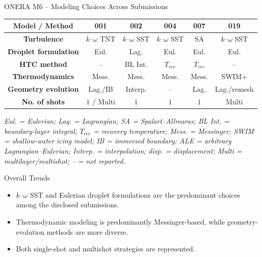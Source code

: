 \begin{frame}{\small ONERA M6 -- Modeling Choices Across Submissions}
\scriptsize

\centering

\renewcommand{\arraystretch}{1.40}
\setlength{\tabcolsep}{2.2pt}

\begin{tabular}{c|ccccc}
\toprule
\textbf{Model / Method}
& \textbf{001}
& \textbf{002}
& \textbf{004}
& \textbf{007}
& \textbf{019} \\
\midrule

\textbf{Turbulence}
& $k$--$\omega$ TNT
& $k$--$\omega$ SST
& $k$--$\omega$ SST
& SA
& $k$--$\omega$ SST \\

\textbf{Droplet formulation}
& Eul.
& Lag.
& Eul.
& Eul.
& Eul. \\

\textbf{HTC method}
& --
& BL Int.
& $T_{rec}$
& $T_{rec}$
& -- \\

\textbf{Thermodynamics}
& Mess.
& Mess.
& Mess.
& Mess.
& SWIM+ \\

\textbf{Geometry evolution}
& Lag./IB
& Interp.
& --
& Lag.
& Lag./remesh \\

\textbf{No. of shots}
& $1$ / Multi
& $1$
& $1$
& $1$
& Multi \\

\bottomrule
\end{tabular}%


\vspace{0.12cm}

\begin{minipage}{0.98\textwidth}
\tiny
\textit{
Eul. = Eulerian;
Lag. = Lagrangian;
SA = Spalart--Allmaras;
BL Int. = boundary-layer integral;
$T_{rec}$ = recovery temperature;
Mess. = Messinger;
SWIM = shallow-water icing model;
IB = immersed boundary;
ALE = arbitrary Lagrangian--Eulerian;
Interp. = interpolation;
disp. = displacement;
Multi = multilayer/multishot;
-- = not reported.
}
\end{minipage}

\vspace{0.10cm}

\begin{block}{\scriptsize Overall Trends}
\begin{itemize}
    \item $k$--$\omega$ SST and Eulerian droplet formulations are the predominant choices among the disclosed submissions.
    \item Thermodynamic modeling is predominantly Messinger-based, while geometry-evolution methods are more diverse.
    \item Both single-shot and multishot strategies are represented.
\end{itemize}
\end{block}

\end{frame}

